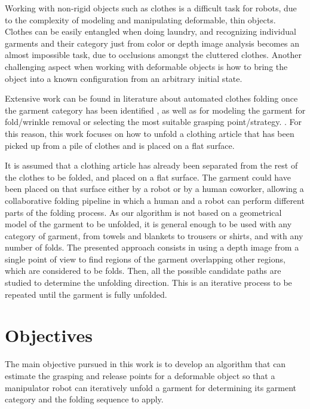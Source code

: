 Working with non-rigid objects such as clothes is a difficult task for robots, due to the complexity of modeling and manipulating deformable, thin objects. Clothes can be easily entangled when doing laundry, and recognizing individual garments and their category just from color or depth image analysis becomes an almost impossible task, due to occlusions amongst the cluttered clothes. Another challenging aspect when working with deformable objects is how to bring the object into a known configuration from an arbitrary initial state.


Extensive work can be found in literature about automated clothes folding once the garment category has been identified  , as well as for modeling the garment for fold/wrinkle removal or selecting the most suitable grasping point/strategy. . For this reason, this work focuses on how to unfold a clothing article that has been picked up from a pile of clothes and is placed on a flat surface. 

It is assumed that a clothing article has already been separated from the rest of the clothes to be folded, and placed on a flat surface. The garment could have been placed on that surface either by a robot or by a human coworker, allowing a collaborative folding pipeline in which a human and a robot can perform different parts of the folding process.
As our algorithm is not based on a geometrical model of the garment to be unfolded, it is general enough to be used with any category of garment, from towels and blankets to trousers or shirts, and with any number of folds. 
%
The presented approach consists in using a depth image from a single point of view to find regions of the garment overlapping other regions, which are considered to be folds. Then, all the possible candidate paths are studied to determine the unfolding direction. This is an iterative process to be repeated until the garment is fully unfolded.

\section{Objectives}
\label{intro_objectives}
The main objective pursued in this work is to develop an algorithm that can estimate the grasping and release points for a deformable object so that a manipulator robot can iteratively unfold a garment for determining its garment category and the folding sequence to apply.

